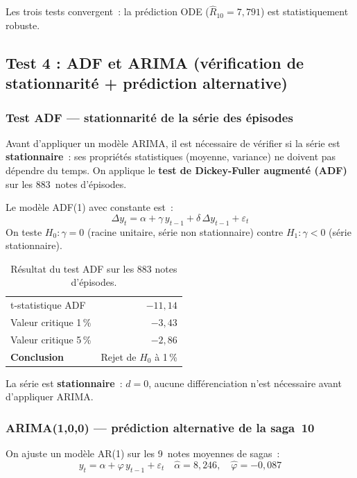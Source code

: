 \documentclass[a4paper,12pt,french]{article}
\begin{document}
Les trois tests convergent~: la prédiction ODE ($\hat{R}_{10} = 7{,}791$) est
statistiquement robuste.

\subsection{Test 4 : ADF et ARIMA (vérification de stationnarité + prédiction alternative)}

\subsubsection*{Test ADF — stationnarité de la série des épisodes}

Avant d'appliquer un modèle ARIMA, il est nécessaire de vérifier si la série
est \textbf{stationnaire}~: ses propriétés statistiques (moyenne, variance) ne
doivent pas dépendre du temps. On applique le \textbf{test de Dickey-Fuller
augmenté (ADF)} sur les 883~notes d'épisodes.

Le modèle ADF(1) avec constante est~:
\begin{equation}
  \Delta y_t = \alpha + \gamma\, y_{t-1} + \delta\,\Delta y_{t-1} + \varepsilon_t
\end{equation}
On teste $H_0 : \gamma = 0$ (racine unitaire, série non stationnaire)
contre $H_1 : \gamma < 0$ (série stationnaire).

\begin{table}[ht!]
\centering
\caption{Résultat du test ADF sur les 883 notes d'épisodes.}
\begin{tabular}{lr}
\toprule
t-statistique ADF & $-11{,}14$ \\
Valeur critique 1\,\% & $-3{,}43$ \\
Valeur critique 5\,\% & $-2{,}86$ \\
\midrule
\textbf{Conclusion} & Rejet de $H_0$ à 1\,\% \\
\bottomrule
\end{tabular}
\end{table}

La série est \textbf{stationnaire}~: $d = 0$, aucune différenciation n'est
nécessaire avant d'appliquer ARIMA.

\subsubsection*{ARIMA(1,0,0) — prédiction alternative de la saga~10}

On ajuste un modèle AR(1) sur les 9~notes moyennes de sagas~:
\begin{equation}
  y_t = \alpha + \varphi\, y_{t-1} + \varepsilon_t
  \quad \hat{\alpha} = 8{,}246,\quad \hat{\varphi} = -0{,}087
\end{equation}
\end{document}
